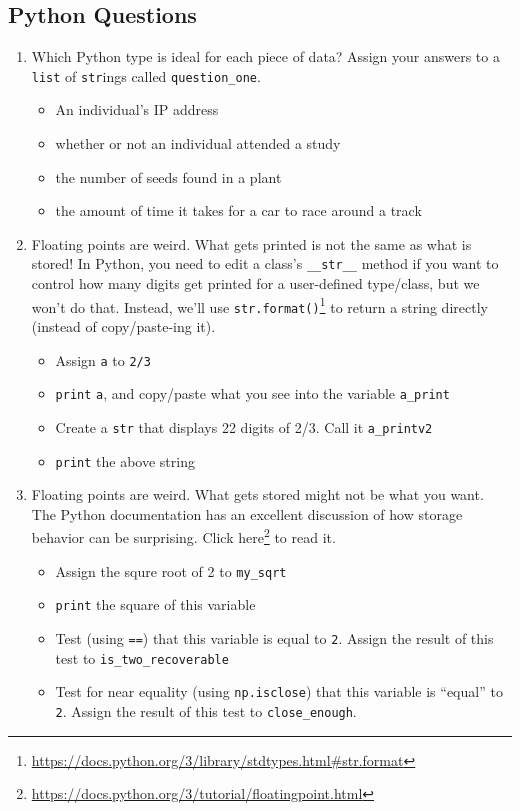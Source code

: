 \documentclass[
  12pt,
  krantz2]{krantz}
\providecommand{\tightlist}{%
  \setlength{\itemsep}{0pt}\setlength{\parskip}{0pt}}
\renewcommand{\href}[2]{#2\footnote{\url{#1}}}
\begin{document}
\hypertarget{python-questions}{%
\subsection{Python Questions}\label{python-questions}}

\begin{enumerate}
\def\labelenumi{\arabic{enumi}.}
\item
  Which Python type is ideal for each piece of data? Assign your answers to a \texttt{list} of \texttt{str}ings called \texttt{question\_one}.

  \begin{itemize}
  \tightlist
  \item
    An individual's IP address
  \item
    whether or not an individual attended a study
  \item
    the number of seeds found in a plant
  \item
    the amount of time it takes for a car to race around a track
  \end{itemize}
\item
  Floating points are weird. What gets printed is not the same as what is stored! In Python, you need to edit a class's \texttt{\_\_str\_\_} method if you want to control how many digits get printed for a user-defined type/class, but we won't do that. Instead, we'll use \href{https://docs.python.org/3/library/stdtypes.html\#str.format}{\texttt{str.format()}} to return a string directly (instead of copy/paste-ing it).

  \begin{itemize}
  \tightlist
  \item
    Assign \texttt{a} to \texttt{2/3}
  \item
    \texttt{print} \texttt{a}, and copy/paste what you see into the variable \texttt{a\_print}
  \item
    Create a \texttt{str} that displays 22 digits of 2/3. Call it \texttt{a\_printv2}
  \item
    \texttt{print} the above string
  \end{itemize}
\item
  Floating points are weird. What gets stored might not be what you want. The Python documentation has an excellent discussion of how storage behavior can be surprising. Click \href{https://docs.python.org/3/tutorial/floatingpoint.html}{here} to read it.

  \begin{itemize}
  \tightlist
  \item
    Assign the squre root of 2 to \texttt{my\_sqrt}
  \item
    \texttt{print} the square of this variable
  \item
    Test (using \texttt{==}) that this variable is equal to \texttt{2}. Assign the result of this test to \texttt{is\_two\_recoverable}
  \item
    Test for near equality (using \texttt{np.isclose}) that this variable is ``equal'' to \texttt{2}. Assign the result of this test to \texttt{close\_enough}.
  \end{itemize}
\end{enumerate}
\end{document}
